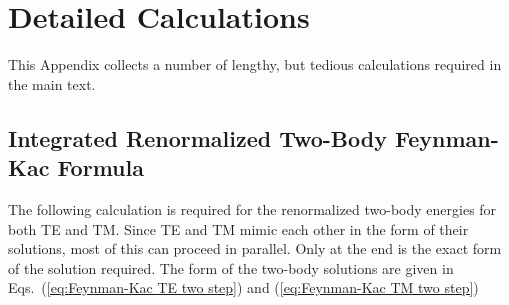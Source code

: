\chapter{Detailed Calculations}
\label{app:nasty_calc}
This Appendix collects a number of lengthy, but tedious calculations required in the main text.  

\section{Integrated Renormalized Two-Body Feynman-Kac Formula}

The following calculation is required for the renormalized two-body energies for both TE and 
TM.  Since TE and TM mimic each other in the form of their solutions, most of this can proceed in 
parallel.  Only at the end is the exact form of the solution required.  The form of the two-body
solutions are given in Eqs.~(\ref{eq:Feynman-Kac TE two step}) and (\ref{eq:Feynman-Kac TM two step})

